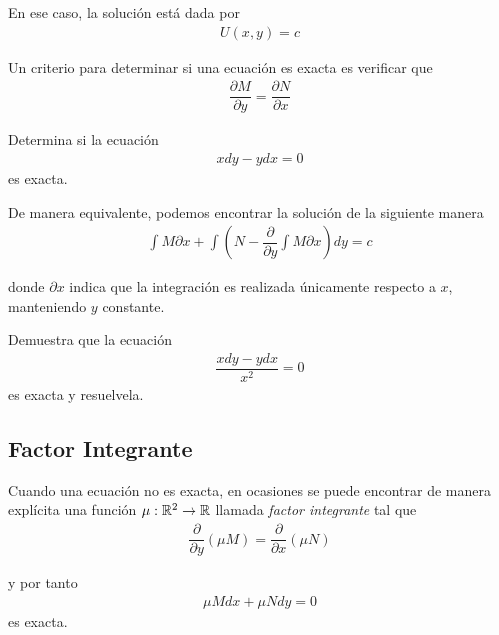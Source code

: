En ese caso, la solución está dada por
\begin{align*}
U(x,y) = c
\end{align*}

{}
Un criterio para determinar si una ecuación es exacta es verificar que
\begin{align*}
    \dfrac{\partial M}{\partial y}= \dfrac{\partial N}{\partial x}
    \end{align*}


	\begin{resuelto}
		Determina si la ecuación
		\begin{align*}
			xdy-ydx=0
		\end{align*}
		es exacta.
	\end{resuelto}

{}
  De manera equivalente, podemos encontrar la solución de la siguiente manera
  \begin{align*}
   \displaystyle \int M\partial x+ \int \left( N - \dfrac{\partial }{\partial y}\int M\partial x \right)dy = c
   \end{align*}

   donde \emph{$\partial x$} indica que la integración es realizada únicamente respecto a $x$, manteniendo $y$ constante.


	\begin{resuelto}
		Demuestra que la ecuación
		\begin{align*}
		\dfrac{xdy-ydx}{x^2}=0
		\end{align*}
		es exacta y resuelvela.
	\end{resuelto}

\subsection{Factor Integrante}
  Cuando una ecuación no es exacta, en ocasiones se puede encontrar de manera explícita una función $\mu:\mathbb{R}^{2}\to \mathbb{R}$ llamada \emph{factor integrante} tal que
\begin{align*}
 \dfrac{\partial }{\partial y}\left( \mu M \right) =
 \dfrac{\partial }{\partial x}\left( \mu N \right)
 \end{align*}

 y por tanto
 \begin{align*}
  \mu M dx + \mu N dy = 0
  \end{align*}
  es exacta.

